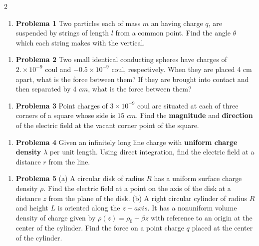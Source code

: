 \documentclass{article}
\begin{document}
\setlength{\columnsep}{2cm}
\begin{multicols}{2}
	\begin{enumerate}[label={{\textcolor{trueblue}{\textbf{Pr.} \arabic*.1}}}, start=2]
		\item \textbf{Problema 1} Two particles each of mass $m$ an having charge $q$, are suspended by strings of length $l$ from a common point. Find the angle $\theta$ which each string makes with the vertical.
	\end{enumerate}
	
	\begin{enumerate}[label={{\textcolor{trueblue}{\textbf{Pr.} \arabic*.2}}}, start=2]
		\item \textbf{Problema 2} Two small identical conducting spheres have charges of $2\text{.}\times 10^{-9}$ coul and $-0\text{.}5\times 10^{-9}$ coul, respectively. When they are placed 4 cm apart, what is the force between them? If they are brought into contact and then separated by $4$ $cm$, what is the force between them?
	\end{enumerate}
	
	\begin{enumerate}[label={{\textcolor{trueblue}{\textbf{Pr.} \arabic*.3}}}, start=2]
		\item \textbf{Problema 3} Point charges of $3 \times 10^{-9}$ coul are situated at each of three corners of a square whose side is $15$ $cm$. Find the \textbf{magnitude} and \textbf{direction} of the electric field at the vacant corner point of the square. 
	\end{enumerate}
	
	\begin{enumerate}[label={{\textcolor{trueblue}{\textbf{Pr.} \arabic*.4}}}, start=2]
		\item \textbf{Problema 4}  Given an infinitely long line charge with \textbf{uniform charge density} $\lambda$ per unit length. Using direct integration, find the electric field at a distance $r$ from the line.
	\end{enumerate}
	
\begin{enumerate}[label={{\textcolor{trueblue}{\textbf{Pr.} \arabic*.5}}}, start=2]
		\item \textbf{Problema 5}  (a) A circular disk of radius $R$ has a uniform surface charge density $\rho$. Find the electric field at a point on the axis of the disk at a distance $z$ from the plane of the disk. (b) A right circular cylinder of radius $R$  and height $L$ is oriented along the $z-axis$. It has a nonuniform volume density of charge given by $\rho(z) = \rho_{0} + \beta{z}$ with reference to an origin at the center of the cylinder. 	Find the force on a point charge $q$ placed at the center of the cylinder.			
	\end{enumerate}	
	

\end{multicols}
\end{document}
